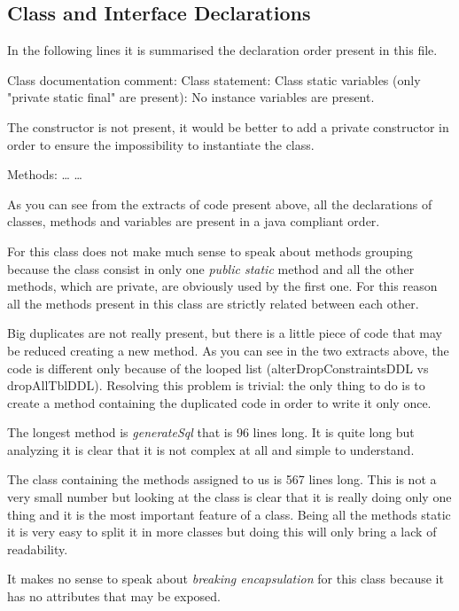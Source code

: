 \documentclass[a4paper]{article}
\begin{document}
\subsection{Class and Interface Declarations}

In the following lines it is summarised the declaration order present in this file.

Class documentation comment:
Class statement:
Class static variables (only "private static final" are present):
No instance variables are present.

The constructor is not present, it would be better to add a private constructor in order to ensure the impossibility to instantiate the class.

Methods:
\ldots
{}
\ldots

As you can see from the extracts of code present above, all the declarations of classes, methods and variables are present in a java compliant order.

For this class does not make much sense to speak about methods grouping because the class consist in only one \emph{public static} method and all the other methods, which are private, are obviously used by the first one. For this reason all the methods present in this class are strictly related between each other.

Big duplicates are not really present, but there is a little piece of code that may be reduced creating a new method.
As you can see in the two extracts above, the code is different only because of the looped list (alterDropConstraintsDDL vs dropAllTblDDL). Resolving this problem is trivial: the only thing to do is to create a method containing the duplicated code in order to write it only once.

The longest method is \emph{generateSql} that is 96 lines long. It is quite long but analyzing it is clear that it is not complex at all and simple to understand. 

The class containing the methods assigned to us is 567 lines long. This is not a very small number but looking at the class is clear that it is really doing only one thing and it is the most important feature of a class. Being all the methods static it is very easy to split it in more classes but doing this will only bring a lack of readability.

It makes no sense to speak about \emph{breaking encapsulation} for this class because it has no attributes that may be exposed.
\end{document}
